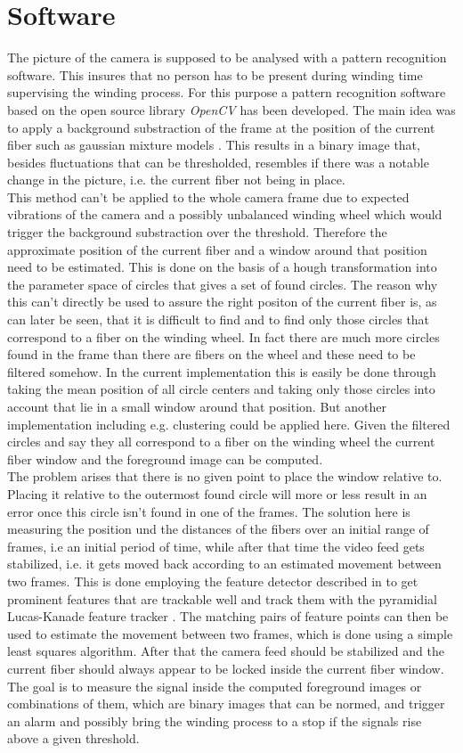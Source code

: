 \section{Software}
\label{sec:Software}

The picture of the camera is supposed to be analysed with a pattern recognition software. This insures that no person has to be present during winding time supervising the winding process. For this purpose a pattern recognition software based on the open source library \emph{OpenCV} has been developed. The main idea was to apply a background substraction of the frame at the position of the current fiber such as gaussian mixture models \cite{MOG01,MOG204,GMG12}. This results in a binary image that, besides fluctuations that can be thresholded, resembles if there was a notable change in the picture, i.e. the current fiber not being in place.\\

This method can't be applied to the whole camera frame due to expected vibrations of the camera and a possibly unbalanced winding wheel which would trigger the background substraction over the threshold. Therefore the approximate position of the current fiber and a window around that position need to be estimated. This is done on the basis of a hough transformation into the parameter space of circles \cite{Yuen90} that gives a set of found circles. The reason why this can't directly be used to assure the right positon of the current fiber is, as can later be seen, that it is difficult to find and to find only those circles that correspond to a fiber on the winding wheel. In fact there are much more circles found in the frame than there are fibers on the wheel and these need to be filtered somehow. In the current implementation this is easily be done through taking the mean position of all circle centers and taking only those circles into account that lie in a small window around that position. But another implementation including e.g. clustering could be applied here. Given the filtered circles and say they all correspond to a fiber on the winding wheel the current fiber window and the foreground image can be computed.\\

The problem arises that there is no given point to place the window relative to. Placing it relative to the outermost found circle will more or less result in an error once this circle isn't found in one of the frames. The solution here is measuring the position und the distances of the fibers over an initial range of frames, i.e an initial period of time, while after that time the video feed gets stabilized, i.e. it gets moved back according to an estimated movement between two frames. This is done employing the feature detector described in \cite{ShiTomasi94} to get prominent features that are trackable well and track them with the pyramidial Lucas-Kanade feature tracker \cite{LK81,Bouguet02PyrLK}. The matching pairs of feature points can then be used to estimate the movement between two frames, which is done using a simple least squares algorithm. After that the camera feed should be stabilized and the current fiber should always appear to be locked inside the current fiber window.\\

The goal is to measure the signal inside the computed foreground images or combinations of them, which are binary images that can be normed, and trigger an alarm and possibly bring the winding process to a stop if the signals rise above a given threshold.
